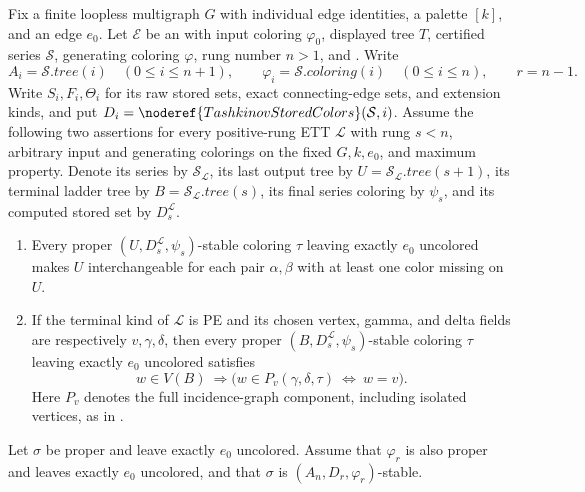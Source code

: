 \begin{helper}
Fix a finite loopless multigraph $G$ with individual edge identities, a
palette $[k]$, and an edge $e_0$.  Let $\mathcal E$ be an
 with input coloring $\varphi_0$, displayed
tree $T$, certified series $\mathcal S$, generating coloring $\varphi$,
rung number $n>1$, and .  Write
\[
 A_i=\mathcal S.\mathit{tree}(i)\quad(0\leq i\leq n+1),
 \qquad \varphi_i=\mathcal S.\mathit{coloring}(i)\quad(0\leq i\leq n),
 \qquad r=n-1.
\]
Write $S_i,F_i,\Theta_i$ for its raw stored sets, exact connecting-edge
sets, and extension kinds, and put
$D_i=\noderef{TashkinovStoredColors}(\mathcal S,i)$.
Assume the following two assertions for every positive-rung ETT
$\mathcal L$ with rung $s<n$, arbitrary input and generating colorings
on the fixed $G,k,e_0$, and maximum property.  Denote its series by
$\mathcal S_{\mathcal L}$, its last output tree by
$U=\mathcal S_{\mathcal L}.\mathit{tree}(s+1)$, its terminal ladder tree
by $B=\mathcal S_{\mathcal L}.\mathit{tree}(s)$, its final series coloring
by $\psi_s$, and its computed stored set by $D_s^{\mathcal L}$.
\begin{enumerate}
\item Every proper $(U,D_s^{\mathcal L},\psi_s)$-stable coloring $\tau$
leaving exactly $e_0$ uncolored makes $U$ interchangeable for each pair
$\alpha,\beta$ with at least one color missing on $U$.
\item If the terminal kind of $\mathcal L$ is PE and its chosen vertex,
gamma, and delta fields are respectively $v,\gamma,\delta$, then every
proper $(B,D_s^{\mathcal L},\psi_s)$-stable coloring $\tau$ leaving exactly
$e_0$ uncolored satisfies
\[
 w\in V(B)\ \Longrightarrow
 \bigl(w\in P_v(\gamma,\delta,\tau)\ \Longleftrightarrow\ w=v\bigr).
\]
Here $P_v$ denotes the full incidence-graph component, including isolated
vertices, as in .
\end{enumerate}
Let $\sigma$ be proper and leave exactly $e_0$ uncolored.  Assume that
$\varphi_r$ is also proper and leaves exactly $e_0$ uncolored, and that
$\sigma$ is $(A_n,D_r,\varphi_r)$-stable.


\end{helper}
